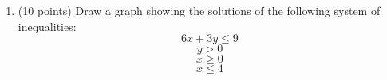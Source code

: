 \documentclass[11pt]{article}
\begin{document}
\begin{enumerate}
\newpage

\item (10 points) Draw a graph showing the solutions of the following system of inequalities:
$$ 6x + 3y \leq 9 $$
$$ y > 0 $$
$$ x \geq 0 $$
$$ x \leq 4 $$

\begin{center}
\end{center}



\end{enumerate}
\end{document}
